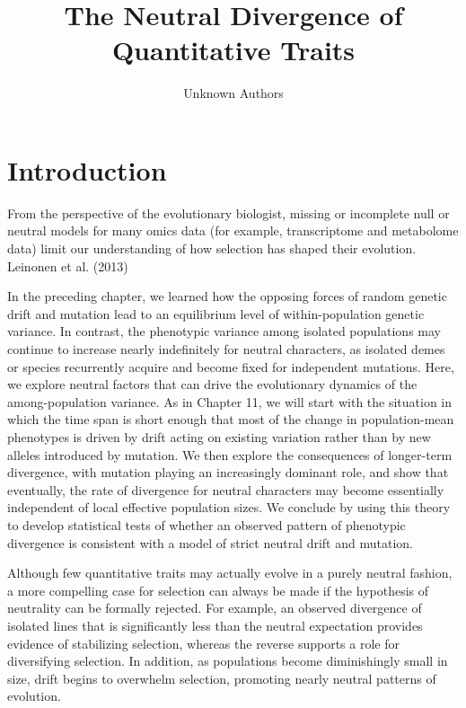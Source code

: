 \documentclass{article}
\title{The Neutral Divergence
of Quantitative Traits}
\author{Unknown Authors}
\date{}
\begin{document}
\maketitle

\begin{abstract}

\end{abstract}

\section{Introduction}
From the perspective of the evolutionary biologist, missing or incomplete null or neutral models for many omics data (for example, transcriptome and metabolome data) limit our understanding of how selection has shaped their evolution. Leinonen et al. (2013)

In the preceding chapter, we learned how the opposing forces of random genetic drift and mutation lead to an equilibrium level of within-population genetic variance. In contrast, the phenotypic variance among isolated populations may continue to increase nearly indefinitely for neutral characters, as isolated demes or species recurrently acquire and become fixed for independent mutations. Here, we explore neutral factors that can drive the evolutionary dynamics of the among-population variance. As in Chapter 11, we will start with the situation in which the time span is short enough that most of the change in population-mean phenotypes is driven by drift acting on existing variation rather than by new alleles introduced by mutation. We then explore the consequences of longer-term divergence, with mutation playing an increasingly dominant role, and show that eventually, the rate of divergence for neutral characters may become essentially independent of local effective population sizes. We conclude by using this theory to develop statistical tests of whether an observed pattern of phenotypic divergence is consistent with a model of strict neutral drift and mutation.

Although few quantitative traits may actually evolve in a purely neutral fashion, a more compelling case for selection can always be made if the hypothesis of neutrality can be formally rejected. For example, an observed divergence of isolated lines that is significantly less than the neutral expectation provides evidence of stabilizing selection, whereas the reverse supports a role for diversifying selection. In addition, as populations become diminishingly small in size, drift begins to overwhelm selection, promoting nearly neutral patterns of evolution.
\end{document}
